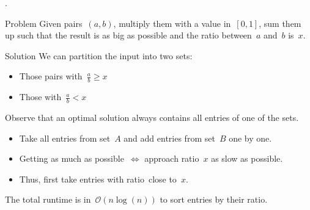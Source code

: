 \begin{frame}{.}
	\begin{block}{Problem}
		Given pairs~$(a, b)$, multiply them with a value in~$[0,1]$, sum them up such that the result is as big as possible and the ratio between~$a$ and~$b$ is~$x$.
	\end{block}
	\pause
	\begin{block}{Solution}
		We can partition the input into two sets:
		\begin{itemize}
			\item Those pairs with~$\frac{a}{b}\ge x$
			\item Those with~$\frac{a}{b}<x$
		\end{itemize}
		Observe that an optimal solution always contains all entries of one of the sets.
		\begin{itemize}
			\item Take all entries from set~$A$ and add entries from set~$B$ one by one.
			\item Getting as much as possible~$\iff$ approach ratio~$x$ as slow as possible.
			\item Thus, first take entries with ratio~close to~$x$.
		\end{itemize}
    The total runtime is in~$\mathcal{O}(n\log(n))$ to sort entries by their ratio.
	\end{block}
\end{frame}

